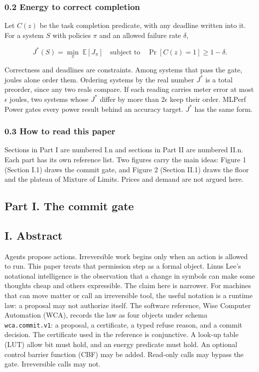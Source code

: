 \documentclass[
  10pt,
]{article}
\begin{document}
\subsubsection{0.2 Energy to correct
completion}\label{energy-to-correct-completion}

Let \(C(z)\) be the task completion predicate, with any deadline written
into it. For a system \(S\) with policies \(\pi\) and an allowed failure
rate \(\delta\),

\[J^*(S) = \min_{\pi} \; \mathbb{E}[J_\pi] \quad \text{subject to} \quad \Pr[C(z) = 1] \ge 1 - \delta .\]

Correctness and deadlines are constraints. Among systems that pass the
gate, joules alone order them. Ordering systems by the real number
\(J^*\) is a total preorder, since any two reals compare. If each
reading carries meter error at most \(\epsilon\) joules, two systems
whose \(J^*\) differ by more than \(2\epsilon\) keep their order. MLPerf
Power gates every power result behind an accuracy target. \(J^*\) has
the same form.

\subsubsection{0.3 How to read this paper}\label{how-to-read-this-paper}

Sections in Part I are numbered I.n and sections in Part II are numbered
II.n. Each part has its own reference list. Two figures carry the main
ideas: Figure 1 (Section I.1) draws the commit gate, and Figure 2
(Section II.1) draws the floor and the plateau of Mixture of Limits.
Prices and demand are not argued here.

\subsection{Part I. The commit gate}\label{part-i.-the-commit-gate}

\subsection{I. Abstract}\label{i.-abstract}

Agents propose actions. Irreversible work begins only when an action is
allowed to run. This paper treats that permission step as a formal
object. Linus Lee's notational intelligence is the observation that a
change in symbols can make some thoughts cheap and others expressible.
The claim here is narrower. For machines that can move matter or call an
irreversible tool, the useful notation is a runtime law: a proposal may
not authorize itself. The software reference, Wise Computer Automation
(WCA), records the law as four objects under schema
\texttt{wca.commit.v1}: a proposal, a certificate, a typed refuse
reason, and a commit decision. The certificate used in the reference is
conjunctive. A look-up table (LUT) allow bit must hold, and an energy
predicate must hold. An optional control barrier function (CBF) may be
added. Read-only calls may bypass the gate. Irreversible calls may not.
\end{document}
